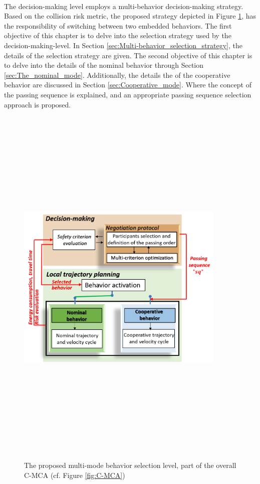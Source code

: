 \\



The decision-making level employs a multi-behavior decision-making strategy. Based on the collision risk metric, the proposed strategy depicted in Figure \ref{fig:behavior_selection},  has the responsibility of switching between two embedded behaviors. The first objective of this chapter is to delve into the selection strategy used by the decision-making-level. In Section \ref{sec:Multi-behavior_selection_strategy}, the details of the selection strategy are given. The second objective of this chapter is to delve into the details of the nominal behavior through Section \ref{sec:The_nominal_mode}. Additionally, the details the of the cooperative behavior are discussed in Section \ref{sec:Cooperative_mode}. Where the concept of the passing sequence is explained, and an appropriate passing sequence selection approach is proposed. 

       \begin{figure}[!h]
        \centering 
        \includegraphics[width=10cm,height=18cm,keepaspectratio]{chapters/Chapitre_6/Figures/Architecture.png}
        \caption{The proposed multi-mode behavior selection level, part of the overall C-MCA (cf. Figure \ref{fig:C-MCA})}
        \label{fig:behavior_selection}
        \end{figure}




